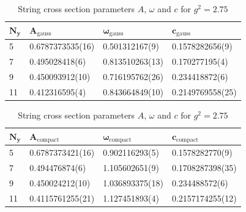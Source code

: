 \begin{table}[!hb]
\centering
\begin{tabular}{llll}
    $\mathbf{N_y}$ & $\mathbf{A_\mathrm{gauss}}$ & $\mathbf{\omega_\mathrm{gauss}}$ & $\mathbf{c_\mathrm{gauss}}$ \\ \hline
   5 & 0.6787373535(16) & 0.501312167(9) & 0.1578282656(9) \\
   7 & 0.495028418(6) & 0.813510263(13) & 0.170277195(4) \\
   9 & 0.450093912(10) & 0.716195762(26) & 0.234418872(6) \\
   11 & 0.412316595(4) & 0.843664849(10) & 0.2149769558(25) \\
\end{tabular}
\begin{tabular}{llll}
    $\mathbf{N_y}$ & $\mathbf{A_\mathrm{compact}}$ & $\mathbf{\omega_\mathrm{compact}}$ & $\mathbf{c_\mathrm{compact}}$ \\ \hline
   5 & 0.6787373421(16) & 0.902116293(5) & 0.1578282770(9) \\
   7 & 0.494476874(6) & 1.105602651(9) & 0.1708287398(35) \\
   9 & 0.450024212(10) & 1.036893375(18) & 0.234488572(6) \\
   11 & 0.4115761255(21) & 1.127451893(4) & 0.2157174255(12) \\
\end{tabular}
\caption{String cross section parameters $A$, $\omega$ and $c$ for $g^2=2.75$}
\end{table}
